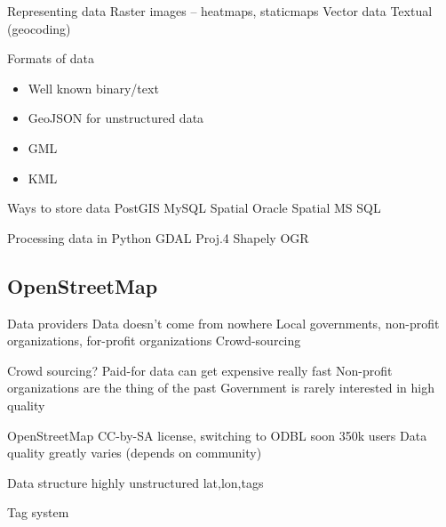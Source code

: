 \documentclass{beamer}
\begin{document}
\begin{frame}{Representing data}
  Raster images -- heatmaps, staticmaps
  Vector data
  Textual (geocoding)
\end{frame}

\begin{frame}{Formats of data}
  \begin{itemize}
  \item Well known binary/text
  \item GeoJSON for unstructured data
  \item GML
  \item KML
  \end{itemize}
\end{frame}

\begin{frame}{Ways to store data}
  PostGIS
  MySQL Spatial
  Oracle Spatial
  MS SQL
\end{frame}

\begin{frame}{Processing data in Python}
  GDAL
  Proj.4
  Shapely
  OGR
\end{frame}

\subsection{OpenStreetMap}

\begin{frame}{Data providers}
  Data doesn't come from nowhere
  Local governments, non-profit organizations, for-profit organizations
Crowd-sourcing
\end{frame}

\begin{frame}{Crowd sourcing?}
  Paid-for data can get expensive really fast
  Non-profit organizations are the thing of the past
  Government is rarely interested in high quality
\end{frame}

\begin{frame}{OpenStreetMap}
  CC-by-SA license, switching to ODBL soon
  350k users
  Data quality greatly varies (depends on community)
\end{frame}

\begin{frame}{Data structure}
highly unstructured
lat,lon,tags
\end{frame}

\begin{frame}{Tag system}

\end{frame}
\end{document}
